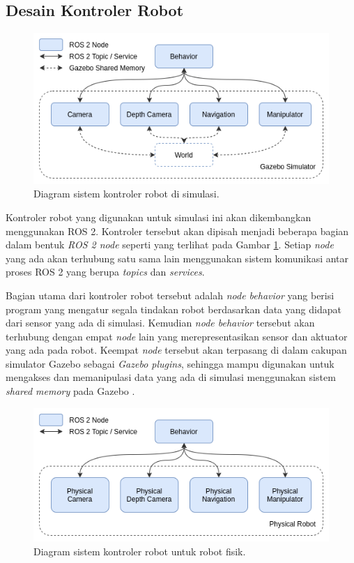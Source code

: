 \subsection{Desain Kontroler Robot}
\label{subsec:desainkontroler}

\begin{figure} [ht]
  \centering
  \includegraphics[scale=0.45]{gambar/kontrolersimulasi.png}
  \caption{Diagram sistem kontroler robot di simulasi.}
  \label{fig:kontrolersimulasi}
\end{figure}

Kontroler robot yang digunakan untuk simulasi ini akan dikembangkan menggunakan ROS 2.
Kontroler tersebut akan dipisah menjadi beberapa bagian dalam bentuk \emph{ROS 2 node} seperti yang terlihat pada Gambar \ref{fig:kontrolersimulasi}.
Setiap \emph{node} yang ada akan terhubung satu sama lain menggunakan sistem komunikasi antar proses ROS 2 yang berupa \emph{topics} dan \emph{services}.

Bagian utama dari kontroler robot tersebut adalah \emph{node behavior} yang berisi program yang mengatur segala tindakan robot berdasarkan data yang didapat dari sensor yang ada di simulasi.
Kemudian \emph{node behavior} tersebut akan terhubung dengan empat \emph{node} lain yang merepresentasikan sensor dan aktuator yang ada pada robot.
Keempat \emph{node} tersebut akan terpasang di dalam cakupan simulator Gazebo sebagai \emph{Gazebo plugins}, sehingga mampu digunakan untuk mengakses dan memanipulasi data yang ada di simulasi menggunakan sistem \emph{shared memory} pada Gazebo \citep{gazeboplugins}.

\begin{figure} [ht] \centering
  \includegraphics[scale=0.45]{gambar/kontrolerfisik.png}
  \caption{Diagram sistem kontroler robot untuk robot fisik.}
  \label{fig:kontrolerfisik}
\end{figure}


